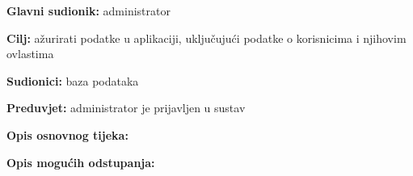                     \noindent {}
					\begin{packed_item}
	
						\item \textbf{Glavni sudionik: }administrator
						\item  \textbf{Cilj:} ažurirati podatke u aplikaciji, uključujući podatke o korisnicima i njihovim ovlastima
						\item  \textbf{Sudionici:} baza podataka
						\item  \textbf{Preduvjet:} administrator je prijavljen u sustav
						\item  \textbf{Opis osnovnog tijeka:}
						
						\item[] \begin{packed_enum}
	
							\item 
							\item 
							\item 

						\end{packed_enum}
						
						\item  \textbf{Opis mogućih odstupanja:}
						
						\item[] \begin{packed_item}
	
							\item[2.a] 
							\item[] \begin{packed_enum}
								
								\item 
								\item 
							\end{packed_enum}
							
						\end{packed_item}
					\end{packed_item}


